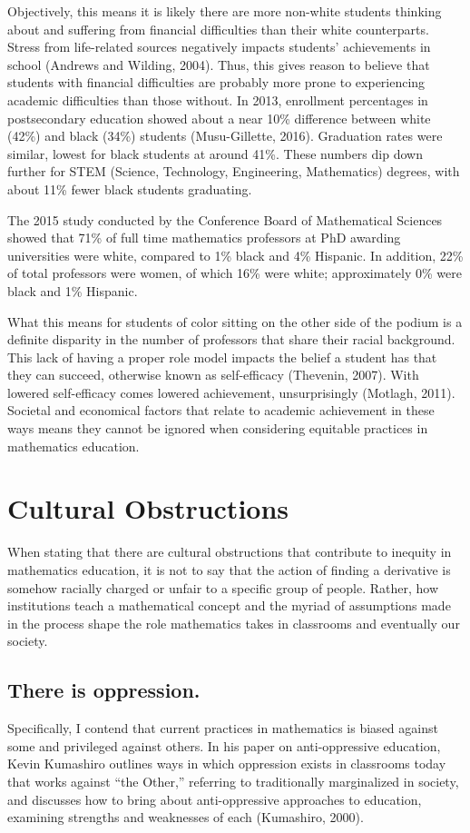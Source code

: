 Objectively, this means it is likely there are more non-white students thinking about and suffering from financial difficulties than their white counterparts. Stress from life-related sources negatively impacts students' achievements in school (Andrews and Wilding, 2004). Thus, this gives reason to believe that students with financial difficulties are probably more prone to experiencing academic difficulties than those without. In 2013, enrollment percentages in postsecondary education showed about a near 10\% difference between white (42\%) and black (34\%) students (Musu-Gillette, 2016). Graduation rates were similar, lowest for black students at around 41\%. These numbers dip down further for STEM (Science, Technology, Engineering, Mathematics) degrees, with about 11\% fewer black students graduating.

The 2015 study conducted by the Conference Board of Mathematical Sciences showed that 71\% of full time mathematics professors at PhD awarding universities were white, compared to 1\% black and 4\% Hispanic. In addition, 22\% of total professors were women, of which 16\% were white; approximately 0\% were black and 1\% Hispanic.

What this means for students of color sitting on the other side of the podium is a definite disparity in the number of professors that share their racial background. This lack of having a proper role model impacts the belief a student has that they can succeed, otherwise known as self-efficacy (Thevenin, 2007). With lowered self-efficacy comes lowered achievement, unsurprisingly (Motlagh, 2011). Societal and economical factors that relate to academic achievement in these ways means they cannot be ignored when considering equitable practices in mathematics education.

\section{Cultural Obstructions}
When stating that there are cultural obstructions that contribute to inequity in mathematics education, it is not to say that the action of finding a derivative is somehow racially charged or unfair to a specific group of people. Rather, how institutions teach a mathematical concept and the myriad of assumptions made in the process shape the role mathematics takes in classrooms and eventually our society.

\subsection{There is oppression.}
Specifically, I contend that current practices in mathematics is biased against some and privileged against others. In his paper on anti-oppressive education, Kevin Kumashiro outlines ways in which oppression exists in classrooms today that works against ``the Other,'' referring to traditionally marginalized in society, and discusses how to bring about anti-oppressive approaches to education, examining strengths and weaknesses of each (Kumashiro, 2000).

